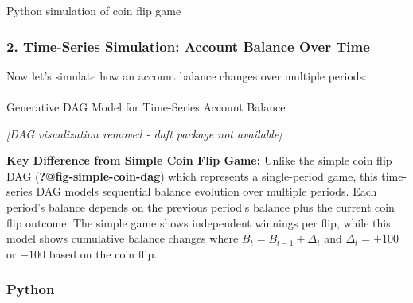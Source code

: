 \documentclass[
  letterpaper,
  DIV=11,
  numbers=noendperiod]{scrartcl}
\makeatletter
\let\oldparagraph\paragraph
\renewcommand{\paragraph}{
    \@ifstar
      \xxxParagraphStar
      \xxxParagraphNoStar
  }
\newcommand{\xxxParagraphStar}[1]{\oldparagraph*{#1}\mbox{}}
\newcommand{\xxxParagraphNoStar}[1]{\oldparagraph{#1}\mbox{}}
\theoremstyle{definition}
\theoremstyle{remark}
\makeatother
\begin{document}
Python simulation of coin flip game

\subsubsection{2. Time-Series Simulation: Account Balance Over
Time}\label{time-series-simulation-account-balance-over-time}

Now let's simulate how an account balance changes over multiple periods:

\paragraph{Generative DAG Model for Time-Series Account
Balance}\label{generative-dag-model-for-time-series-account-balance}

\emph{{[}DAG visualization removed - daft package not available{]}}

\textbf{Key Difference from Simple Coin Flip Game:} Unlike the simple
coin flip DAG (\textbf{?@fig-simple-coin-dag}) which represents a
single-period game, this time-series DAG models sequential balance
evolution over multiple periods. Each period's balance depends on the
previous period's balance plus the current coin flip outcome. The simple
game shows independent winnings per flip, while this model shows
cumulative balance changes where \(B_t = B_{t-1} + \Delta_t\) and
\(\Delta_t = +100\) or \(-100\) based on the coin flip.

\subsubsection{Python}\label{python-1}
\end{document}
